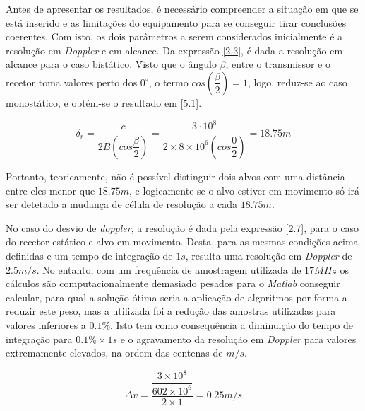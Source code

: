 Antes de apresentar os resultados, é necessário compreender a situação em que se está inserido e as limitações do equipamento para se conseguir tirar conclusões coerentes. Com isto, os dois parâmetros a serem considerados inicialmente é a resolução em \textit{Doppler} e em alcance. Da expressão \ref{2.3}, é dada a resolução em alcance para o caso bistático. Visto que o ângulo $\beta$, entre o transmissor e o recetor toma valores perto dos $0^{\circ}$, o termo $cos\left( \dfrac{\beta}{2}\right) = 1$, logo, reduz-se ao caso monostático, e obtém-se o resultado em \ref{5.1}.

\begin{equation} \label{5.1}
\delta_{r}=\dfrac{c}{2B\left( cos\dfrac{\beta}{2}\right)}=\dfrac{3\cdot 10^{8}}{2\times 8\times 10^{6} \left( cos\dfrac{0}{2}\right)}=18.75 m
\end{equation}

Portanto, teoricamente, não é possível distinguir dois alvos com uma distância entre eles menor que $18.75 m$, e logicamente se o alvo estiver em movimento só irá ser detetado a mudança de célula de resolução a cada $18.75 m$.\par 

No caso do desvio de \textit{doppler}, a resolução é dada pela expressão \ref{2.7}, para o caso do recetor estático e alvo em movimento. Desta, para as mesmas condições acima definidas e um tempo de integração de $1 s$, resulta uma resolução em \textit{Doppler} de $2.5 m/s$. No entanto, com um frequência de amostragem utilizada de $17 MHz$ os cálculos são computacionalmente demasiado pesados para o \textit{Matlab} conseguir calcular, para qual a solução ótima seria a aplicação de algoritmos por forma a reduzir este peso, mas a utilizada foi a redução das amostras utilizadas para valores inferiores a $0.1\% $. Isto tem como consequência a diminuição do tempo de integração para $0.1\% \times 1s$ e o agravamento da resolução em \textit{Doppler} para valores extremamente elevados, na ordem das centenas de $m/s$.

\begin{equation} \label{5.2}
\Delta v = \dfrac{\dfrac{3\times 10^{8}}{602\times 10^{6}}}{2\times 1} = 0.25 m/s
\end{equation}



